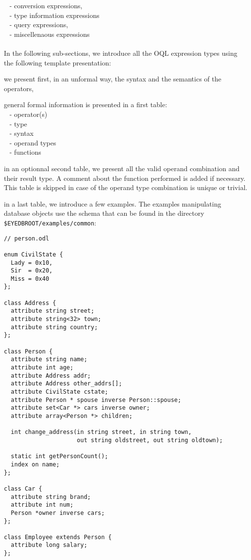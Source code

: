 \mbox{ } - conversion expressions,\\
\mbox{ } - type information expressions\\
\mbox{ } - query expressions,\\
\mbox{ } - miscellenaous expressions\\
\\
In the following sub-sections, we introduce all the OQL expression types
using the following template presentation:\\
\be
\item we present first, in an unformal way, the syntax and the semantics
of the operators,
\item general formal information is presented in a first table:\\
\mbox{ } - operator(s)\\
\mbox{ } - type\\
\mbox{ } - syntax\\
\mbox{ } - operand types\\
\mbox{ } - functions
\item in an optionnal second table, we present all the valid operand combination
and their result type. A comment about the function performed is added
if necessary. This table is skipped in case of the operand type combination
is unique or trivial.
\item in a last table, we introduce a few examples. The examples
manipulating database objects use the schema that can be found in
the directory\\
\texttt{\$EYEDBROOT/examples/common}:
\verbsize
\begin{verbatim}
// person.odl

enum CivilState {
  Lady = 0x10,
  Sir  = 0x20,
  Miss = 0x40
};

class Address {
  attribute string street;
  attribute string<32> town;
  attribute string country;
};

class Person {
  attribute string name;
  attribute int age;
  attribute Address addr;
  attribute Address other_addrs[];
  attribute CivilState cstate;
  attribute Person * spouse inverse Person::spouse;
  attribute set<Car *> cars inverse owner;
  attribute array<Person *> children;

  int change_address(in string street, in string town,
                     out string oldstreet, out string oldtown);

  static int getPersonCount();
  index on name;
};

class Car {
  attribute string brand;
  attribute int num;
  Person *owner inverse cars;
};

class Employee extends Person {
  attribute long salary;
};
\end{verbatim}
